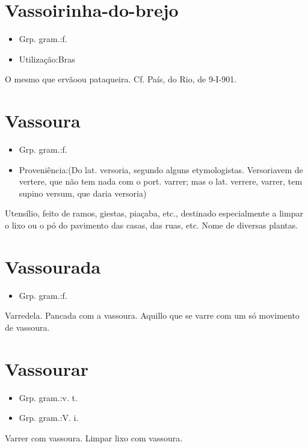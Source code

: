 \documentclass{article}
\begin{document}
\section{Vassoirinha-do-brejo}
\begin{itemize}
\item {Grp. gram.:f.}
\end{itemize}
\begin{itemize}
\item {Utilização:Bras}
\end{itemize}
O mesmo que \textunderscore ervão\textunderscore  ou \textunderscore pataqueira\textunderscore . Cf. \textunderscore País\textunderscore , do Rio, de 9-I-901.
\section{Vassoura}
\begin{itemize}
\item {Grp. gram.:f.}
\end{itemize}
\begin{itemize}
\item {Proveniência:(Do lat. \textunderscore versoria\textunderscore , segundo alguns etymologistas. \textunderscore Versoria\textunderscore  vem de \textunderscore vertere\textunderscore , que não tem nada com o port. \textunderscore varrer\textunderscore ; mas o lat. \textunderscore verrere\textunderscore , varrer, tem supino \textunderscore versum\textunderscore , que daria \textunderscore versoria\textunderscore )}
\end{itemize}
Utensílio, feito de ramos, giestas, piaçaba, etc., destinado especialmente a limpar o lixo ou o pó do pavimento das casas, das ruas, etc.
Nome de diversas plantas.
\section{Vassourada}
\begin{itemize}
\item {Grp. gram.:f.}
\end{itemize}
Varredela.
Pancada com a vassoura.
Aquillo que se varre com um só movimento de vassoura.
\section{Vassourar}
\begin{itemize}
\item {Grp. gram.:v. t.}
\end{itemize}
\begin{itemize}
\item {Grp. gram.:V. i.}
\end{itemize}
Varrer com vassoura.
Limpar lixo com vassoura.
\end{document}
